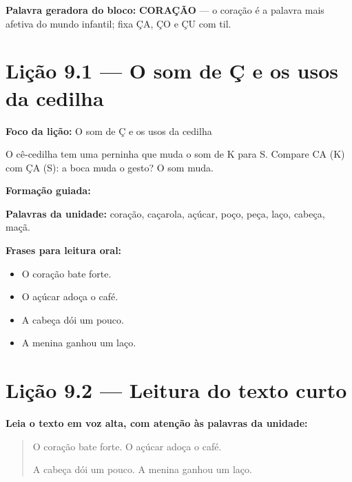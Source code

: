 \textbf{Palavra geradora do bloco:} \textbf{CORAÇÃO} --- o coração é a palavra mais afetiva do mundo infantil; fixa ÇA, ÇO e ÇU com til.

\section{Lição 9.1 --- O som de Ç e os usos da cedilha}

\textbf{Foco da lição:} O som de Ç e os usos da cedilha


\begin{boquinha}
O cê-cedilha tem uma perninha que muda o som de K para S. Compare CA (K) com ÇA (S): a boca muda o gesto? O som muda.
\end{boquinha}

\noindent\textbf{Formação guiada:}

\begin{center}
\end{center}

\noindent\textbf{Palavras da unidade:} coração, caçarola, açúcar, poço, peça, laço, cabeça, maçã.

\noindent\textbf{Frases para leitura oral:}
\begin{itemize}[leftmargin=1.6em]
  \item O coração bate forte.
  \item O açúcar adoça o café.
  \item A cabeça dói um pouco.
  \item A menina ganhou um laço.
\end{itemize}

\section{Lição 9.2 --- Leitura do texto curto}

\noindent\textbf{Leia o texto em voz alta, com atenção às palavras da unidade:}


\begin{quote}
O coração bate forte. O açúcar adoça o café.

A cabeça dói um pouco. A menina ganhou um laço.
\end{quote}

